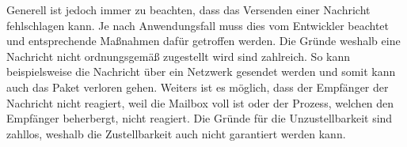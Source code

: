 Generell ist jedoch immer zu beachten, dass das Versenden einer Nachricht fehlschlagen kann. Je nach Anwendungsfall muss dies vom Entwickler beachtet und entsprechende Maßnahmen dafür getroffen werden. Die Gründe weshalb eine Nachricht nicht ordnungsgemäß zugestellt wird sind zahlreich. So kann beispielsweise die Nachricht über ein Netzwerk gesendet werden und somit kann auch das Paket verloren gehen. Weiters ist es möglich, dass der Empfänger der Nachricht nicht reagiert, weil die Mailbox voll ist oder der Prozess, welchen den Empfänger beherbergt, nicht reagiert. Die Gründe für die Unzustellbarkeit sind zahllos, weshalb die Zustellbarkeit auch nicht garantiert werden kann. \citep{messagedeliveryreliabilityakkadocumentation}







 